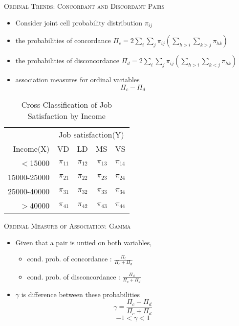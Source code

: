 \documentclass[dvipdfmx, serif,handout]{beamer}
\begin{document}
\begin{frame}{\textsc{Ordinal Trends: Concordant and Discordant Pairs}}
	\begin{itemize}
		\item Consider joint cell probability distribution $\pi_{ij}$
	\end{itemize}

	\begin{itemize}
		\item the probabilities of concordance
		      $\Pi_{c} = 2 \sum_{i} \sum_{j} \pi_{ij}(\sum_{h>i} \sum_{k>j} \pi_{hk})$
		\item the probabilities of disconcordance
		      $\Pi_{d} = 2 \sum_{i} \sum_{j} \pi_{ij}(\sum_{h>i} \sum_{k<j} \pi_{hk})$
		\item association measures for ordinal variables
		      $$\Pi_c - \Pi_d$$
	\end{itemize}


	{\scriptsize
	\begin{table} %
		\begin{tabular}{rrrrr}
			\hline
			            & \multicolumn{4}{c}{Job satisfaction(Y)}                                        \\
			Income(X)   & VD                                      & LD         & MS         & VS         \\
			\hline
			$<$15000    & $\pi_{11}$                              & $\pi_{12}$ & $\pi_{13}$ & $\pi_{14}$ \\
			15000-25000 & $\pi_{21}$                              & $\pi_{22}$ & $\pi_{23}$ & $\pi_{24}$ \\
			25000-40000 & $\pi_{31}$                              & $\pi_{32}$ & $\pi_{33}$ & $\pi_{34}$ \\
			$>$40000    & $\pi_{41}$                              & $\pi_{42}$ & $\pi_{43}$ & $\pi_{44}$ \\
			\hline
		\end{tabular}
		\caption{\scriptsize Cross-Classification of Job Satisfaction by Income}
	\end{table}
	}


\end{frame}
\begin{frame}{\textsc{Ordinal Measure of Association: Gamma}}
	\begin{itemize}
		\item Given that a pair is untied on both variables,
		      \begin{itemize}
			      \item cond. prob. of  concordance : $\frac{\Pi_c}{\Pi_c + \Pi_d}$
			      \item cond. prob. of disconcordance : $\frac{\Pi_d}{\Pi_c + \Pi_d}$
		      \end{itemize}
		\item $\gamma$ is  difference between these probabilities
		      $$\gamma=\frac{\Pi_c-\Pi_d}{\Pi_c + \Pi_d}$$
		      $$-1<\gamma<1$$
	\end{itemize}

\end{frame}
\end{document}
